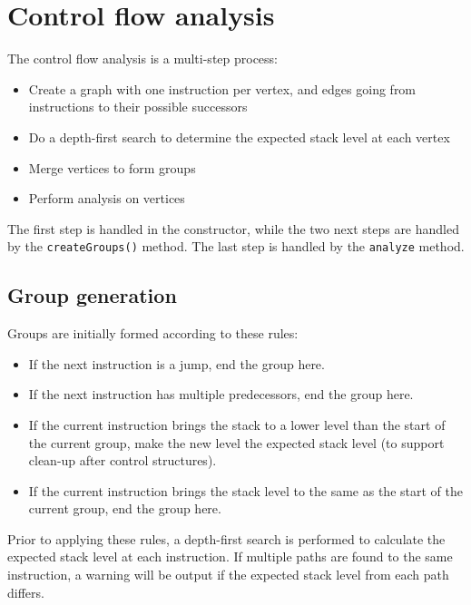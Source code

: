 \section{Control flow analysis}

The control flow analysis is a multi-step process:

\begin{itemize}
\item Create a graph with one instruction per vertex, and edges going from instructions to their possible successors
\item Do a depth-first search to determine the expected stack level at each vertex
\item Merge vertices to form groups
\item Perform analysis on vertices
\end{itemize}

The first step is handled in the constructor, while the two next steps are handled by the \verb+createGroups()+ method. The last step is handled by the \verb+analyze+ method.

\subsection{Group generation}
Groups are initially formed according to these rules:
\begin{itemize}
\item If the next instruction is a jump, end the group here.
\item If the next instruction has multiple predecessors, end the group here.
\item If the current instruction brings the stack to a lower level than the start of the current group, make the new level the expected stack level (to support clean-up after control structures).
\item If the current instruction brings the stack level to the same as the start of the current group, end the group here.
\end{itemize}

Prior to applying these rules, a depth-first search is performed to calculate the expected stack level at each instruction. If multiple paths are found to the same instruction, a warning will be output if the expected stack level from each path differs.

\subsection{Short-circuit detection}
As part of the group generation, the decompiler can combine multiple, consecutive groups if it detects them as being part of a single condition check that are merely split up due to short-circuiting.

